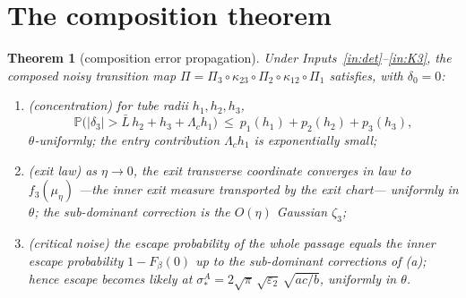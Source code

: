 \documentclass[11pt]{article}
\newtheorem{theorem}{Theorem}
\theoremstyle{definition}
\theoremstyle{remark}
\newcommand{\Pp}{\mathbb P}
\begin{document}
\section{The composition theorem}

\begin{theorem}[composition error propagation]\label{thm:main}
Under Inputs~\ref{in:det}--\ref{in:K3}, the composed noisy transition map
$\Pi=\Pi_3\circ\kappa_{23}\circ\Pi_2\circ\kappa_{12}\circ\Pi_1$ satisfies, with
$\delta_0=0$:
\begin{enumerate}
\item[\textup{(a)}] \textup{(concentration)} for tube radii $h_1,h_2,h_3$,
\[
  \Pp\bigl(|\delta_3|>\bar L\,h_2+h_3+\Lambda_c h_1\bigr)\ \le\ p_1(h_1)+p_2(h_2)+p_3(h_3),
\]
$\theta$-uniformly; the entry contribution $\Lambda_c h_1$ is exponentially small;
\item[\textup{(b)}] \textup{(exit law)} as $\eta\to0$, the exit transverse coordinate
converges in law to $f_3(\mu_\eta)$ ---the inner exit measure transported by the exit
chart--- uniformly in $\theta$; the sub-dominant correction is the $O(\eta)$ Gaussian
$\zeta_3$;
\item[\textup{(c)}] \textup{(critical noise)} the escape probability of the whole passage
equals the inner escape probability $1-F_\beta(0)$ up to the sub-dominant corrections of
\textup{(a)}; hence escape becomes likely at
$\sigma_*^A=2\sqrt\pi\,\sqrt{\varepsilon_2}\,\sqrt{ac/b}$, uniformly in $\theta$.
\end{enumerate}
\end{theorem}
\end{document}
